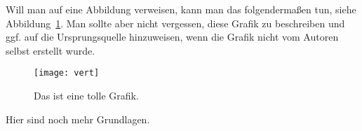 \documentclass[
     12pt,                    %
     a4paper,             %
     BCOR10mm,     %
     DIV14,                 %
     listof=totoc,                    %
     bibliography=totoc,       %
     index=totoc,              %
     twoside,
     headsepline
     ]{scrreprt}
\begin{document}
Will man auf eine Abbildung verweisen, kann man das folgendermaßen tun, siehe Abbildung~\ref{fig:foobar}.
Man sollte aber nicht vergessen, diese Grafik zu beschreiben und ggf. auf die Ursprungsquelle hinzuweisen, wenn die Grafik nicht vom Autoren selbst erstellt wurde.

\begin{figure}[htb]
\centering
\texttt{[image: vert]}
\caption[Kurzname der tollen Grafik]{\label{fig:foobar}Das ist eine tolle Grafik.}
\end{figure}

\clearpage
Hier sind noch mehr Grundlagen.



\end{document}
